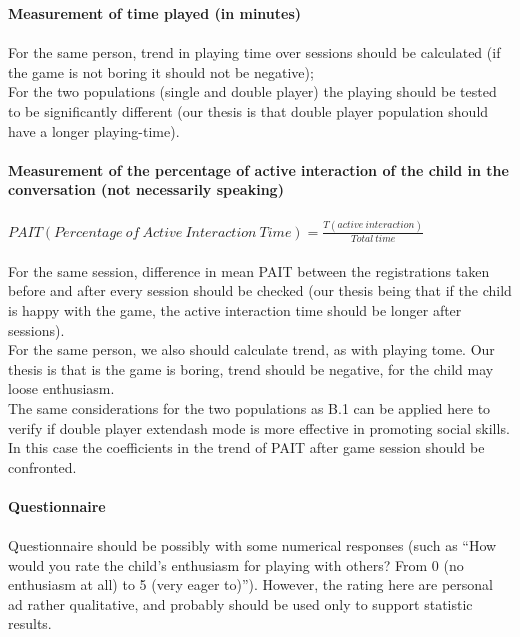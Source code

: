 \documentclass[a4paper,twoside]{book}
\begin{document}
\textbf{Measurement of time played (in minutes)}
\\
\\
For the same person, trend in playing time over sessions should be calculated (if the game is not boring it should not be negative);
\\
For the two populations (single and double player) the playing should be tested to be significantly different (our thesis is that double player population should have a longer playing-time).
\\
\\
\textbf{Measurement of the percentage of active interaction of the child in the conversation (not necessarily speaking)}
\\
\\
$PAIT (Percentage\ of\ Active\ Interaction\ Time)=\frac{T(active\ interaction)}{Total\ time}$
\\
\\
For the same session, difference in mean PAIT between the registrations taken before and after every session should be checked (our thesis being that if the child is happy with the game, the active interaction time should be longer after sessions).
\\
For the same person, we also should calculate trend, as with playing tome. Our thesis is that is the game is boring, trend should be negative, for the child may loose enthusiasm.
\\
The same considerations for the two populations as B.1 can be applied here to verify if double player	extendash mode is more effective in promoting social skills. In this case the coefficients in the trend of PAIT after game session should be confronted.
\\
\\
\textbf{Questionnaire}
\\
\\
Questionnaire should be possibly with some numerical responses (such as \textquotedblleft How would you rate the child's enthusiasm for playing with others? From 0 (no enthusiasm at all) to 5 (very eager to)\textquotedblright). However, the rating here are personal ad rather qualitative, and probably should be used only to support statistic results.
\\
\end{document}
